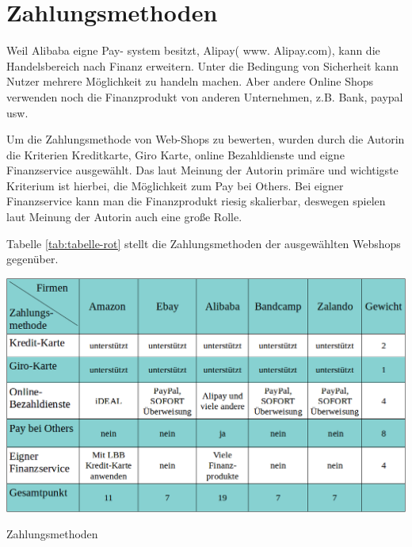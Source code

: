 \section{Zahlungsmethoden}

Weil Alibaba eigne Pay- system besitzt, Alipay( www. Alipay.com), kann die Handelsbereich nach Finanz erweitern. Unter die Bedingung von Sicherheit kann Nutzer mehrere Möglichkeit zu handeln  machen. Aber andere Online Shops verwenden noch die Finanzprodukt von anderen Unternehmen, z.B. Bank, paypal usw.

Um die Zahlungsmethode von Web-Shops zu bewerten, wurden durch die Autorin die Kriterien Kreditkarte, Giro Karte, online Bezahldienste und eigne Finanzservice ausgewählt. Das laut Meinung der Autorin primäre und wichtigste Kriterium ist hierbei, die Möglichkeit zum Pay bei Others. Bei eigner Finanzservice kann man die Finanzprodukt riesig skalierbar, deswegen spielen laut Meinung der Autorin auch eine große Rolle.

Tabelle \vref{tab:tabelle-rot} stellt die Zahlungsmethoden der ausgewählten Webshops gegenüber.

\begin{table}[htbp]
	\centering
	\includegraphics[width=1\textwidth]{bilder/tabelle-blau.png}
	\caption{Zahlungsmethoden}
	\label{tab:tabelle-blau}
\end{table}
